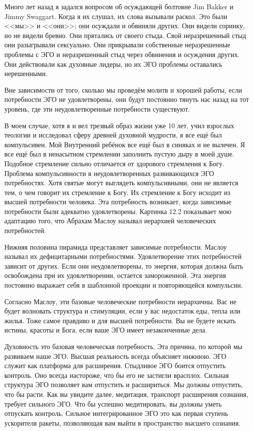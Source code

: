 \documentclass[10pt, fleqn]{article}
\begin{document}
Много лет назад я задался вопросом об осуждающей болтовне Jim Bakker и Jimmy Swaggart. Когда я их слушал, их слова вызывали раскол. Это были <<мы>> и <<они>>; они осуждали и обвиняли других. Они видели соринку, но не видели бревно. Они прятались от своего стыда. Свой неразрешенный стыд они разыгрывали сексуально. Они прикрывали собственные неразрешенные проблемы с ЭГО и неразрешенный стыд через обвинения и осуждения других. Они действовали как духовные лидеры, но их ЭГО проблемы оставались нерешенными.

Вне зависимости от того, сколько мы проведём молитв и хорошей работы, если потребности ЭГО не удовлетворены, они будут постоянно тянуть нас назад на тот уровень, где эти неудовлетворенные потребности существуют.

В моем случае, хотя я и вел трезвый образ жизни уже 10 лет, учил взрослых теологии и исследовал сферу древней духовной мудрости, я все ещё был компульсивен. Мой Внутренний ребёнок все ещё был в синяках и не вылечен. Я все ещё был в ненасытном стремлении заполнить пустую дыру в моей душе. Подобное стремление сильно отличается от здорового стремления к Богу. Проблема компульсивности в неудовлетворенных развивающихся ЭГО потребностях. Хотя святые могут выглядеть компульсивными, они не является тем, о чем говорит их стремление к Богу. Их стремление к Богу исходит из высшей потребности человека. Эта потребность возникает, когда зависимые потребности были адекватно удовлетворены. Картинка 12.2 показывает мою адаптацию того, что Абрахам Маслоу называл иерархией человеческих потребностей.

Нижняя половина пирамида представляет зависимые потребности. Маслоу называл их дефицитарными потребностями. Удовлетворение этих потребностей зависит от других. Если они неудовлетворены, то энергия, которая должна быть освобождена при их удовлетворении, остается замороженной. Эта энергия постоянно выражает себя в шаблонной проекции и повторяющейся компульсии.

Согласно Маслоу, эти базовые человеческие потребности иерархичны. Вас не будет волновать структура и стимуляции, если у вас недостаток еды, тепла или жилья. Тоже самое правдиво и для высшей потребности. Вы не будете искать истины, красоты и Бога, если ваше ЭГО имеет незаконченные дела.

Духовность это базовая человеческая потребность. Эта причина, по которой мы развиваем наше ЭГО. Высшая реальность всегда объясняет нижнюю. ЭГО служит как платформа для расширения. Стыдливое ЭГО боится отпустить контроль. Оно всегда настороже, что бы его не застигли врасплох. Сильная структура ЭГО позволяет вам отпустить и расшириться. Мы должны отпустить, что бы расти. Как вы увидите далее, медитация, транспорт расширения сознания, требует сильного ЭГО. Что бы успешно медитировать, вы должны уметь отпускать контроль. Сильное интегрированное ЭГО это как первая ступень ускорителя ракеты, позволяющая вам выйти в пространство высшего сознания.
\end{document}
